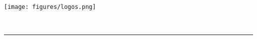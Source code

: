 \thispagestyle{empty}
\pagecolor{bleu}\afterpage{\nopagecolor}

\begin{center}
\texttt{[image: figures/logos.png]}	%
\end{center}

\vspace{3cm}
\begin{center}
{\huge \color{white} \sf \titre}
\vspace{2cm}
\\ {\color{white} \sf \Large  \auteur}

\vspace{4cm}
\begin{center}
{\color{white} \noindent\rule{2cm}{0.4pt}}
\end{center}
\vspace{1cm}
{\color{white} \sf \Large  \promoteur}
\vspace{1cm}
\\ {\color{white} \sf  \small  \master}
\\ {\color{white} \sf  \small  \annee}
\pagebreak

\end{center}
